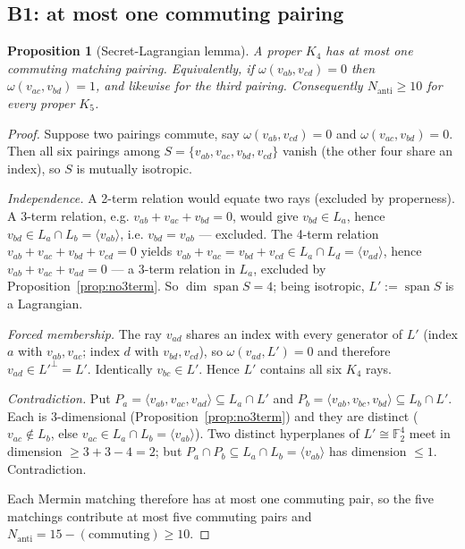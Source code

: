 \documentclass[11pt,a4paper]{article}
\newtheorem{proposition}[theorem]{Proposition}
\theoremstyle{remark}
\begin{document}
\subsection{B1: at most one commuting pairing}

\begin{proposition}[Secret-Lagrangian lemma]\label{prop:b1}
A proper $K_4$ has at most one commuting matching pairing. Equivalently, if
$\omega(v_{ab},v_{cd})=0$ then $\omega(v_{ac},v_{bd})=1$, and likewise for the
third pairing. Consequently $N_{\mathrm{anti}}\geq 10$ for every proper $K_5$.
\end{proposition}

\begin{proof}
Suppose two pairings commute, say $\omega(v_{ab},v_{cd})=0$ and
$\omega(v_{ac},v_{bd})=0$. Then all six pairings among
$S=\{v_{ab},v_{ac},v_{bd},v_{cd}\}$ vanish (the other four share an index), so $S$
is mutually isotropic.

\emph{Independence.} A 2-term relation would equate two rays (excluded by
properness). A 3-term relation, e.g. $v_{ab}+v_{ac}+v_{bd}=0$, would give
$v_{bd}\in L_a$, hence $v_{bd}\in L_a\cap L_b=\langle v_{ab}\rangle$, i.e.
$v_{bd}=v_{ab}$ — excluded. The 4-term relation
$v_{ab}+v_{ac}+v_{bd}+v_{cd}=0$ yields
$v_{ab}+v_{ac}=v_{bd}+v_{cd}\in L_a\cap L_d=\langle v_{ad}\rangle$, hence
$v_{ab}+v_{ac}+v_{ad}=0$ — a 3-term relation in $L_a$, excluded by
Proposition~\ref{prop:no3term}. So $\dim\operatorname{span}S=4$; being isotropic, $L'
:=\operatorname{span}S$ is a Lagrangian.

\emph{Forced membership.} The ray $v_{ad}$ shares an index with every generator of
$L'$ (index $a$ with $v_{ab},v_{ac}$; index $d$ with $v_{bd},v_{cd}$), so
$\omega(v_{ad},L')=0$ and therefore $v_{ad}\in L'^\perp=L'$. Identically
$v_{bc}\in L'$. Hence $L'$ contains all six $K_4$ rays.

\emph{Contradiction.} Put $P_a=\langle v_{ab},v_{ac},v_{ad}\rangle\subseteq L_a\cap
L'$ and $P_b=\langle v_{ab},v_{bc},v_{bd}\rangle\subseteq L_b\cap L'$. Each is
$3$-dimensional (Proposition~\ref{prop:no3term}) and they are distinct
($v_{ac}\notin L_b$, else $v_{ac}\in L_a\cap L_b=\langle v_{ab}\rangle$). Two
distinct hyperplanes of $L'\cong\mathbb{F}_2^4$ meet in dimension
$\geq 3+3-4=2$; but $P_a\cap P_b\subseteq L_a\cap L_b=\langle v_{ab}\rangle$ has
dimension $\leq 1$. Contradiction.

Each Mermin matching therefore has at most one commuting pair, so the five
matchings contribute at most five commuting pairs and
$N_{\mathrm{anti}}=15-(\text{commuting})\geq 10$.
\end{proof}
\end{document}
